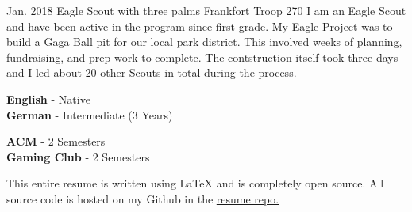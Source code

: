 \documentclass[9pt]{developercv} %
\begin{document}

\begin{entrylist}
	\entry
		{Jan. 2018}
		{Eagle Scout with three palms}
		{Frankfort Troop 270}
		{I am an Eagle Scout and have been active in the program since first grade. My Eagle Project was to build a Gaga Ball pit for our local park district. This involved weeks of planning, fundraising, and prep work to complete. The contstruction itself took three days and I led about 20 other Scouts in total during the process.}
\end{entrylist}

\begin{minipage}[t]{0.3\textwidth}
	\vspace{-\baselineskip} %

	
	\textbf{English} - Native\\
	\textbf{German} - Intermediate (3 Years)\\
\end{minipage}
\hfill
\begin{minipage}[t]{0.25\textwidth}
	\vspace{-\baselineskip} %
	
	
	\textbf{ACM} - 2 Semesters\\
	\textbf{Gaming Club} - 2 Semesters\\
\end{minipage}
\hfill
\begin{minipage}[t]{0.4\textwidth}
	\vspace{-\baselineskip} %
	
	
	This entire resume is written using LaTeX and is completely open source. All source code is hosted on my Github in the \href{https://www.github.com/Dizeeee/resume}{resume repo.}
\end{minipage}

\end{document}
